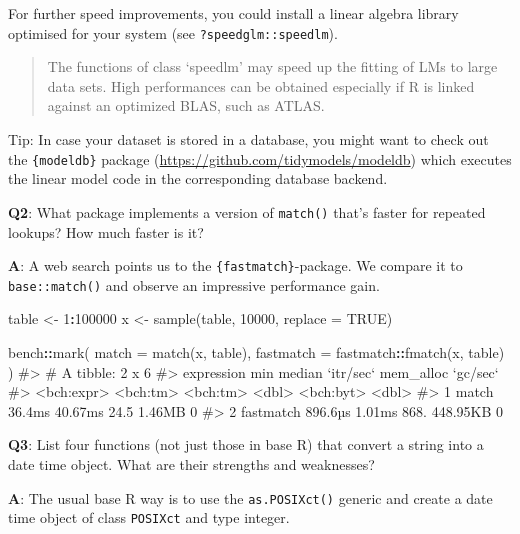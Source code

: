 \documentclass[
]{krantz}
\makeatletter
\newenvironment{Shaded}{\begin{snugshade}}{\end{snugshade}}
\newcommand{\CommentTok}[1]{\textcolor[rgb]{0.56,0.35,0.01}{\textit{#1}}}
\newcommand{\DataTypeTok}[1]{\textcolor[rgb]{0.13,0.29,0.53}{#1}}
\newcommand{\DecValTok}[1]{\textcolor[rgb]{0.00,0.00,0.81}{#1}}
\newcommand{\KeywordTok}[1]{\textcolor[rgb]{0.13,0.29,0.53}{\textbf{#1}}}
\newcommand{\NormalTok}[1]{#1}
\newcommand{\OperatorTok}[1]{\textcolor[rgb]{0.81,0.36,0.00}{\textbf{#1}}}
\newcommand{\OtherTok}[1]{\textcolor[rgb]{0.56,0.35,0.01}{#1}}
\newcommand{\StringTok}[1]{\textcolor[rgb]{0.31,0.60,0.02}{#1}}
\renewcommand{\href}[2]{#2 (\url{#1})}
\newenvironment{kframe}{%
\medskip{}
\setlength{\fboxsep}{.8em}
 \def\at@end@of@kframe{}%
 \ifinner\ifhmode%
  \def\at@end@of@kframe{\end{minipage}}%
  \begin{minipage}{\columnwidth}%
 \fi\fi%
 \def\FrameCommand##1{\hskip\@totalleftmargin \hskip-\fboxsep
 \colorbox{shadecolor}{##1}\hskip-\fboxsep
     \hskip-\linewidth \hskip-\@totalleftmargin \hskip\columnwidth}%
 \MakeFramed {\advance\hsize-\width
   \@totalleftmargin\z@ \linewidth\hsize
   \@setminipage}}%
 {\par\unskip\endMakeFramed%
 \at@end@of@kframe}
\renewenvironment{Shaded}{\begin{kframe}}{\end{kframe}}
\renewcommand{\KeywordTok} [1]{\textcolor[rgb]{0.00,0.44,0.13}{{#1}}}
\renewcommand{\DataTypeTok}[1]{\textcolor[rgb]{0.56,0.13,0.00}{{#1}}}
\renewcommand{\DecValTok}  [1]{\textcolor[rgb]{0.25,0.63,0.44}{{#1}}}
\renewcommand{\StringTok}  [1]{\textcolor[rgb]{0.25,0.44,0.63}{{#1}}}
\renewcommand{\CommentTok} [1]{\textcolor[rgb]{0.38,0.63,0.69}{{#1}}}
\renewcommand{\OtherTok}   [1]{\textcolor[rgb]{0.00,0.44,0.13}{{#1}}}
\renewcommand{\NormalTok}  [1]{{#1}}
\makeatother
\begin{document}
For further speed improvements, you could install a linear algebra library optimised for your system (see \texttt{?speedglm::speedlm}).

\begin{quote}
The functions of class `speedlm' may speed up the fitting of LMs to large data sets. High performances can be obtained especially if R is linked against an optimized BLAS, such as ATLAS.
\end{quote}

Tip: In case your dataset is stored in a database, you might want to check out the \href{https://github.com/tidymodels/modeldb}{\texttt{\{modeldb\}} package} which executes the linear model code in the corresponding database backend.

\textbf{{Q2}}: What package implements a version of \texttt{match()} that's faster for repeated lookups? How much faster is it?

\textbf{{A}}: A web search points us to the \texttt{\{fastmatch\}}-package. We compare it to \texttt{base::match()} and observe an impressive performance gain.

\begin{Shaded}
\begin{Highlighting}[]
\NormalTok{table <-}\StringTok{ }\DecValTok{1}\OperatorTok{:}\DecValTok{100000}
\NormalTok{x <-}\StringTok{ }\KeywordTok{sample}\NormalTok{(table, }\DecValTok{10000}\NormalTok{, }\DataTypeTok{replace =} \OtherTok{TRUE}\NormalTok{)}

\NormalTok{bench}\OperatorTok{::}\KeywordTok{mark}\NormalTok{(}
  \DataTypeTok{match =} \KeywordTok{match}\NormalTok{(x, table),}
  \DataTypeTok{fastmatch =}\NormalTok{ fastmatch}\OperatorTok{::}\KeywordTok{fmatch}\NormalTok{(x, table)}
\NormalTok{) }
\CommentTok{#> # A tibble: 2 x 6}
\CommentTok{#>   expression      min   median `itr/sec` mem_alloc `gc/sec`}
\CommentTok{#>   <bch:expr> <bch:tm> <bch:tm>     <dbl> <bch:byt>    <dbl>}
\CommentTok{#> 1 match        36.4ms  40.67ms      24.5    1.46MB        0}
\CommentTok{#> 2 fastmatch   896.6µs   1.01ms     868.   448.95KB        0}
\end{Highlighting}
\end{Shaded}

\textbf{{Q3}}: List four functions (not just those in base R) that convert a string into a date time object. What are their strengths and weaknesses?

\textbf{{A}}: The usual base R way is to use the \texttt{as.POSIXct()} generic and create a date time object of class \texttt{POSIXct} and type integer.
\end{document}
